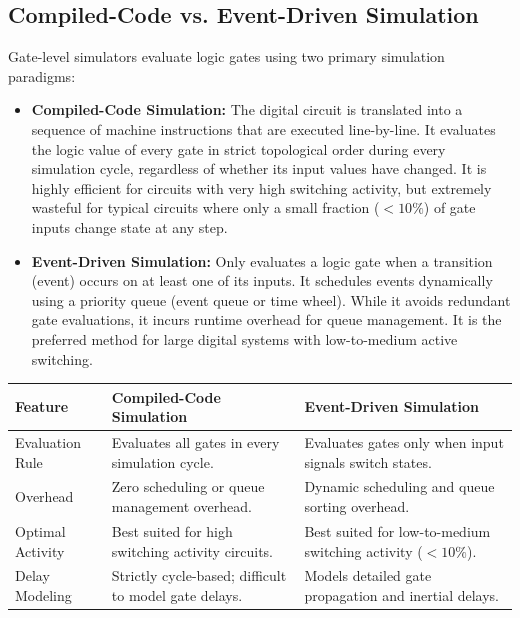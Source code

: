 \documentclass[12pt,a4paper]{article}
\renewcommand{\arraystretch}{1.45}
\begin{document}
\subsection{Compiled-Code vs. Event-Driven Simulation}
Gate-level simulators evaluate logic gates using two primary simulation paradigms:
\begin{itemize}[leftmargin=*, itemsep=3pt]
  \item \textbf{Compiled-Code Simulation:} The digital circuit is translated into a sequence of machine instructions that are executed line-by-line. It evaluates the logic value of every gate in strict topological order during every simulation cycle, regardless of whether its input values have changed. It is highly efficient for circuits with very high switching activity, but extremely wasteful for typical circuits where only a small fraction ($<10\%$) of gate inputs change state at any step.
  \item \textbf{Event-Driven Simulation:} Only evaluates a logic gate when a transition (event) occurs on at least one of its inputs. It schedules events dynamically using a priority queue (event queue or time wheel). While it avoids redundant gate evaluations, it incurs runtime overhead for queue management. It is the preferred method for large digital systems with low-to-medium active switching.
\end{itemize}

\par\vspace{6pt}\noindent
{\renewcommand{\arraystretch}{1.35}%
\begin{tabularx}{\linewidth}{|B{3.2cm}|Y|Y|}
\hline
\textbf{Feature} & \textbf{Compiled-Code Simulation} & \textbf{Event-Driven Simulation} \\
\hline
Evaluation Rule & Evaluates all gates in every simulation cycle. & Evaluates gates only when input signals switch states. \\
\hline
Overhead & Zero scheduling or queue management overhead. & Dynamic scheduling and queue sorting overhead. \\
\hline
Optimal Activity & Best suited for high switching activity circuits. & Best suited for low-to-medium switching activity ($<10\%$). \\
\hline
Delay Modeling & Strictly cycle-based; difficult to model gate delays. & Models detailed gate propagation and inertial delays. \\
\hline
\end{tabularx}}
\end{document}
